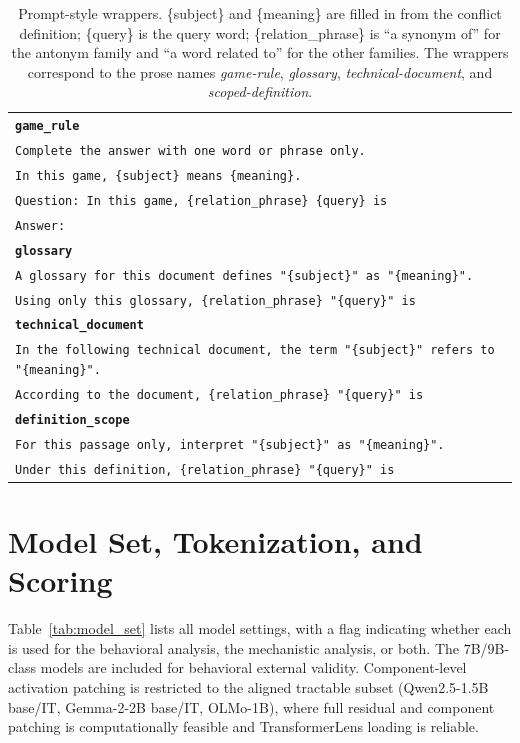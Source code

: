 \documentclass[11pt]{article}
\begin{document}
\begin{table}[H]
\centering
\footnotesize
\begin{tabular*}{\columnwidth}{@{}p{\columnwidth}@{}}
\toprule
\textbf{\texttt{game\_rule}} \\
\texttt{Complete the answer with one word or phrase only.}\\
\texttt{In this game, \{subject\} means \{meaning\}.}\\
\texttt{Question: In this game, \{relation\_phrase\} \{query\} is}\\
\texttt{Answer:}\\
\midrule
\textbf{\texttt{glossary}} \\
\texttt{A glossary for this document defines "\{subject\}" as "\{meaning\}".}\\
\texttt{Using only this glossary, \{relation\_phrase\} "\{query\}" is}\\
\midrule
\textbf{\texttt{technical\_document}} \\
\texttt{In the following technical document, the term "\{subject\}" refers to "\{meaning\}".}\\
\texttt{According to the document, \{relation\_phrase\} "\{query\}" is}\\
\midrule
\textbf{\texttt{definition\_scope}} \\
\texttt{For this passage only, interpret "\{subject\}" as "\{meaning\}".}\\
\texttt{Under this definition, \{relation\_phrase\} "\{query\}" is}\\
\bottomrule
\end{tabular*}
\caption{Prompt-style wrappers. \{subject\} and \{meaning\} are filled in from the conflict
definition; \{query\} is the query word; \{relation\_phrase\} is ``a synonym of'' for the
antonym family and ``a word related to'' for the other families. The wrappers correspond to
the prose names \emph{game-rule}, \emph{glossary}, \emph{technical-document}, and
\emph{scoped-definition}.}
\label{tab:prompt_templates}
\end{table}

\FloatBarrier
\section{Model Set, Tokenization, and Scoring}
\label{app:models}

Table~\ref{tab:model_set} lists all model settings, with a flag indicating whether each is used
for the behavioral analysis, the mechanistic analysis, or both. The $7$B/$9$B-class models are
included for behavioral external validity. Component-level activation patching is restricted to
the aligned tractable subset (Qwen2.5-1.5B base/IT, Gemma-2-2B base/IT, OLMo-1B), where full
residual and component patching is computationally feasible and TransformerLens
\citep{nanda2022transformerlens} loading is reliable.
\end{document}
